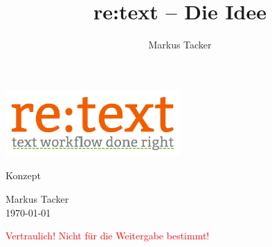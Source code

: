 \documentclass[11pt,a4paper]{article}
\begin{document}
\author{Markus Tacker}
\title{re:text -- Die Idee}

\begin{center}

\includegraphics[width=0.5\textwidth]{../../layout/logo.pdf}

\bigskip

\begin{huge}Konzept\end{huge}

\bigskip

\begin{small}Markus Tacker\\
\today

\textcolor{red}{Vertraulich! Nicht für die Weitergabe bestimmt!}

\end{small}

\end{center}



\pagebreak

\tableofcontents

\pagebreak


\end{document}
